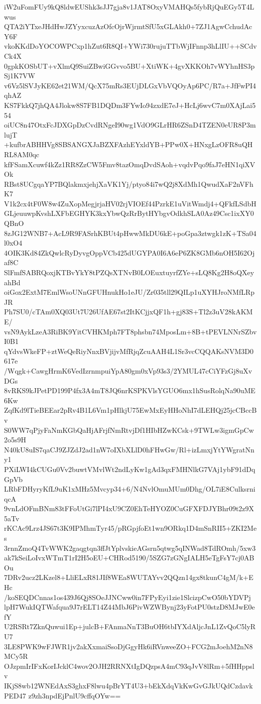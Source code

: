 iW2uFomFUy9kQ8ldwEUShk3sJJ7gja8v1JAT8OxyVMAHQs5fybRjQuEGy5T4Lwus
QTA2iYTxeJHdHwJZYyxcuzAzOfcOjrWjrmtSfU5xGLAkh0+7ZJ1AgwCchudAcY6F
vkoKKdDoYOCOWPCxp1hZut6R8QI+YWi730rujuTTbWjIFnnp3hLlIU++SCdvCk4X
0gpkKOSbUT+vXlmQ9SuiZBwiGGvvo5BU+XtiWK+4gvXKKOh7vWYhnHS3pSj1K7VW
v6Vz5lSVJyKE62et21WM/QcX75mRs3EUjDLGxVbVQOyAp6PC/R7a+JfFwPI4qhAZ
KS7FkkQ7jhQA4Jlokw8S7FB1DQDm3FYwIo94zxdE7eJ+HcLj6wvC7m0XAjLai554
oiUC8n47OtxFcJDXGpDzCvdRNgeI90wg1VdO9GLrHR6ZSnD4TZEN0eUR8P3mlujT
+kufbrABHHVg8SBSANGXJaBZXFAzhEYxldYB+PPw0X+HNxgLzOFR8uQHRL8AM0qc
kfFSamXcuwf4kZz1RR8ZzCW5Fmv8tazOmqDvdSAoh+vqdvPqo9faJ7eHN1qiXVOk
RBst8UCgqaYP7BQlakmxjehjXaVK1Yj/ptyo84i7wQ2j8XdMh1QwudXaF2nVFhK7
V1k2cx4tF0W8w4ZuXopMegjrjaHV02rjVIOEf44PzrkE1uVitWmdj4+QFkfLSdbH
GLjeuuwpKvshLXFbEGHYK3kxYbwQzRrBytHYbgvOdkhSLA0Az49Csc1ixXY0QBnO
8zJG12WNB7+AcL9R9FASrhKBUt4pHwwMkDU6kE+poGpa3ztwgk1zK+TSa04l0xO4
4OIK3Kd84ZkQwlcRyDyvgOppVCb425dUGYPA0I6A6eP6ZK8GMb6nOH5I62Ojaf8C
SlFmfSABRQoxjKTBvYkY8tPZQsXTNvB0LOEuxtuyrfZYe+sLQ8Kg2H8oQXeyahBd
oiGox2ExtM7EmlWsoUNnGFUHnukHo1eJU/Zr035tll29QILp1uXYHJroNMfLRpJR
Ph7SU0/cTAm0XQ03Ut7U26UfAE67st2ItKCjjxQF1h+gj83S+Tl2z3uV28kAKME/
vsN9AykLzeA3RiBK9YitCVHKMph7FT8phsbn74MposLm+8B+tPEVLNNrSZbvI0B1
qYdvsWkeFP+ztWeQeRiyNnxBVjijvMfRjqZcuAAH4L1Sr3vcCQQAKsNVM3D0617e
/Wqgk+CawgHrmK6VedIzrnmpuiYpA80gm0xVp93s3/2YMUL47cCiYFzGj8uXvDGs
8vRKS9kJPetPD199P4fx3A4mT8JQ6nrKSPKVlsYGUO6mx1hSusRolqNa90uME6Kw
ZqfKd9lTieBEEar2pRv4B1L6Vm1pHlkjU75EwMxEyHHoNhI7dLEHQj25jcCBccBv
S0WW7qPjyFaNmKGbQaHjAFrjfNmRtvjDf1HIbHZwKCsk+9TWLw3igmGpCw2o5s9H
N40kU8uIS7qaCJ9ZJZdJ2ad1nW7oIXbXLlD0hFHwGw/Rl+izLmxjYtYWgratNny1
PXiLWI4kCUGu0Vv2buwtVMvlWt2ndLyKw1gAd3qxFMHNlkG7VAj1ybF91dDqGpVb
LRbFDHyryKfL9uK1xMHz5Mvcyp34+6/N4NvlOmuMUm0Dhg/OL7iE8CulksrniqcA
9vnLdOFmBNm83tFFoUtGi7lPI4xU9CZ0EhTeHYOZ0CuGFXFDJYBhr09t2z9X5aTv
rKCAc9Lrz4JS67t3K9IPMhmTyr45/pRGpjfoEt1wn9ORkq1D4mSnRII5+ZKI2Mes
3rnnZmoQ4TvWWK2gaqgtqn3ffJtYplvskieAGsrn5qtwg5qINWad8TdROmh/5xw3
ak7kSeiLoIvxWTmT1rI2H5oEU+CHRod5190/5SZG7zGNgIALH5eTgFsY7cj0ABOu
7DRv2ucz2LKzel8+LliELxR81JIf8WEa8WUTAYvv2QQzn14gx8tkunC4gM/k+EHc
/koSEQDCnnas1os439J6Qj8SOeJJNCww0in7FPyEyi1zie1SlcizpCwO50bYDVPj
lpH7WukIQTWafqua9J7rELT14Z44MbJ6PivWZWBynj23yFotPU0stzD8MJwE0efY
U2RSRt7ZknQuwui1Ep+julcB+FAnmaNnT3BuOH6tbIYXdAljcJnL1ZvQoC5lyRU7
3LE8PWK9wFJWR1jv2akXxmaiSsoDjGgyHk6iRVnweeZO+FCG2mJoehM2nN8MCy5R
OJzpmIrIFxKorIJcklC4wov2OJH2RRNXtIgDQzpsA4mC93qJvV8lRm+5fHHppslv
IKjS8wb12WNEdAxS3ghxF8lwu4pBrYT4U3+bEkXdqVkKwGvGJkUQdCzdavkPED47
z9zh3npdEjPnlU9cffqOYw==
